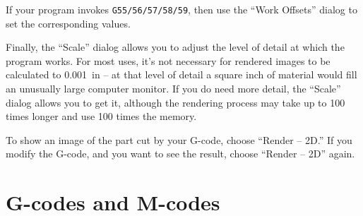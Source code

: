 \documentclass[titlepage,oneside,10pt]{article}
\begin{document}
If your program invokes {\tt G55/56/57/58/59}, then use the ``Work
Offsets'' dialog to set the corresponding values.

Finally, the ``Scale'' dialog allows you to adjust the level of detail
at which the program works. For most uses, it's not necessary for
rendered images to be calculated to 0.001~in -- at that level of
detail a square inch of material would fill an unusually large
computer monitor. If you do need more detail, the ``Scale'' dialog
allows you to get it, although the rendering process may take up to
100 times longer and use 100 times the memory.

To show an image of the part cut by your G-code, choose ``Render --
2D.'' If you modify the G-code, and you want to see the result,
choose ``Render -- 2D'' again.

\section{G-codes and M-codes}
\end{document}
